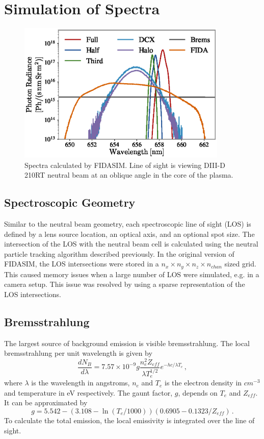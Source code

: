 \section{Simulation of Spectra}
\begin{figure}[h!]
    \centering
    \includegraphics[width=10cm]{figures/spectra.eps}
    \caption{Spectra calculated by FIDASIM. Line of sight is viewing DIII-D 210RT neutral beam at an oblique angle in the core of the plasma.}
    \label{fig:spectra}
\end{figure}
\subsection{Spectroscopic Geometry}
Similar to the neutral beam geometry, each spectroscopic line of sight (LOS) is defined by a lens source location, an optical axis, and an optional spot size. The intersection of the LOS with the neutral beam cell is calculated using the neutral particle tracking algorithm described previously. In the original version of FIDASIM, the LOS intersections were stored in a $n_x \times n_y \times n_z \times n_{chan}$ sized grid. This caused memory issues when a large number of LOS were simulated, e.g. in a camera setup. This issue was resolved by using a sparse representation of the LOS intersections.

\subsection{Bremsstrahlung}
The largest source of background emission is visible bremsstrahlung. The local bremsstrahlung per unit wavelength is given by
\begin{equation}\label{eq:brems}
    \frac{dN_B}{d\lambda} = 7.57\times10^{-9} g\frac{n_e^2 Z_{eff}}{\lambda T_e^{1/2}}e^{-hc/\lambda T_e}\,,
\end{equation}
where $\lambda$ is the wavelength in angstroms, $n_e$ and $T_e$ is the electron density in $cm^{-3}$ and temperature in eV respectively. The gaunt factor, $g$, depends on $T_e$ and $Z_{eff}$. It can be approximated by
\begin{equation}\label{eq:gaunt}
    g = 5.542 - (3.108 - \ln(T_e/1000))(0.6905 - 0.1323/Z_{eff})\,.
\end{equation}
To calculate the total emission, the local emissivity is integrated over the line of sight.\cite{van2010imaging}

